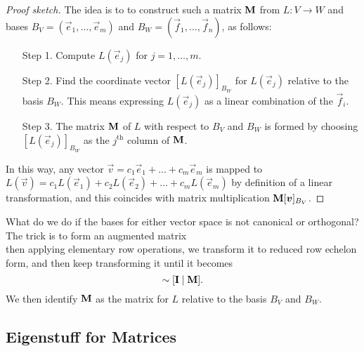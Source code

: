\begin{proof}[Proof sketch]
The idea is to to construct such a matrix $\mathbf{M}$ from $L\colon V\to W$
and bases $B_{V}=(\vec{e}_{1},\dots,\vec{e}_{m})$ and
$B_{W}=(\vec{f}_{1},\dots,\vec{f}_{n})$, as follows:
\begin{itemize}
\item[Step 1.] Compute $L(\vec{e}_{j})$ for $j=1,\dots,m$.
\item[Step 2.] Find the coordinate vector $[L(\vec{e}_{j})]_{B_{W}}$ for
  $L(\vec{e}_{j})$ relative to the basis $B_{W}$. This means expressing
  $L(\vec{e}_{j})$ as a linear combination of the $\vec{f}_{i}$.
\item[Step 3.] The matrix $\mathbf{M}$ of $L$ with respect to $B_{V}$ and
  $B_{W}$ is formed by choosing $[L(\vec{e}_{j})]_{B_{W}}$ as the
  $j^{\text{th}}$ column of $\mathbf{M}$.
\end{itemize}
In this way, any vector $\vec{v} = c_{1}\vec{e}_{1}+\dots+c_{m}\vec{e}_{m}$
is mapped to $L(\vec{v}) = c_{1}L(\vec{e}_{1}) + c_{2}L(\vec{e}_{2}) + \dots + c_{m}L(\vec{e}_{m})$
by definition of a linear transformation, and this coincides with matrix
multiplication $\mathbf{M}[\boldsymbol{v}]_{B_{V}}$.
\end{proof}

\M
What do we do if the bases for either vector space is not canonical or
orthogonal? The trick is to form an augmented matrix
\begin{equation}
[\vec{f}_{1}\quad\dots\quad f_{n}\mid L(\vec{e}_{1})\quad\dots\quad L(\vec{e}_{m})]
\end{equation}
then applying elementary row operations, we transform it to reduced row
echelon form, and then keep transforming it until it becomes
\begin{equation}
[\vec{f}_{1}\quad\dots\quad f_{n}\mid L(\vec{e}_{1})\quad\dots\quad L(\vec{e}_{m})]\sim[\mat{I}\mid\mat{M}].
\end{equation}
We then identify $\mathbf{M}$ as the matrix for $L$ relative to the basis
$B_{V}$ and $B_{W}$.

\subsection{Eigenstuff for Matrices}

